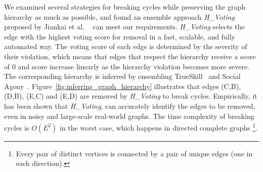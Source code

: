 \documentclass[letterpaper]{article} \usepackage{aaai19}  \usepackage{times}  \usepackage{helvet}  \usepackage{courier}  \usepackage{url}  \usepackage{graphicx}  \usepackage{booktabs} \usepackage{xcolor}
\begin{document}
We examined several strategies for breaking cycles while preserving the graph hierarchy as much as possible, and found an ensemble approach {\em H\_Voting}  proposed by Jiankai  et al. ~\cite{Sun2017} can meet our requirements. {\em H\_Voting} selects the edge with the highest voting score for removal in a fast, scalable, and fully automated way. The voting score of each edge is determined by the severity of their violation, which means that edges that respect the hierarchy receive a score of $0$ and score increase linearly as the hierarchy violation becomes more severe. The corresponding hierarchy is inferred by ensembling TrueSkill~\cite{trueskill2007} and Social Agony~\cite{Gupte2011agony,tatti2015}. Figure~\ref{fig:inferring_graph_hierarchy} illustrates that edges (C,B), (D,B), (E,C) and (E,D) are removed  by {\em H\_Voting} to break cycles. Empirically, it has been shown that {\em H\_Voting}, can accurately identify the edges to be removed, even in noisy and large-scale real-world graphs. The time complexity of breaking cycles is $O(E^2)$ in the worst case, which happens in directed complete graphs \footnote{Every pair of distinct vertices is connected by a pair of unique edges (one in each direction).}.

\begin{comment}
Sun et al. ~\cite{Sun2017} proposed $6$ different heuristic strategies of breaking cycles to reduce $G$ to $G'$,  while maintaining the graph hierarchy as much as possible, inferred by a range of features such as TrueSkill (TS)~\cite{trueskill2007}  and Social Agony (SA)~\cite{tatti2015}. {\em H\_Voting} is used as the voting scheme to ensemble the above $6$ strategies for breaking cycles in a graph.
{\em H\_Voting} selects the edge with the highest voting score for removal in a fast, scalable, and fully automated way. For example, Figure~\ref{fig:inferring_graph_hierarchy} illustrates that edges (C,B), (D,B), (E,C) and (E,D) are removed  by {\em H\_Voting} to break cycles. We also examined two other voting strategies - {\em SA\_Voting} and {\em TS\_Voting}, which ensembles $3$ Social Agony and $3$ TrueSkill based strategies respectively in our experiments. Empirically, it has been shown that voting based approaches, especially {\em SA\_Voting}, can accurately identify the edges to be removed, even in noisy and large-scale real-world graphs. The time complexity of breaking cycles is $O(E^2)$ in the worst case, which happens in directed complete graphs \footnote{Every pair of distinct vertices is connected by a pair of unique edges (one in each direction).}.\looseness=-1


\end{comment}
\end{document}
